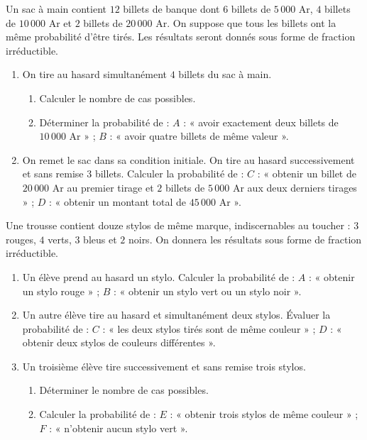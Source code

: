 \begin{annales}
Un sac à main contient $12$ billets de banque dont $6$ billets de
$5\,000$ Ar, $4$ billets de $10\,000$ Ar et $2$ billets de $20\,000$ Ar. On
suppose que tous les billets ont la même probabilité d'être tirés. Les
résultats seront donnés sous forme de fraction irréductible.
\begin{enumerate}[label=\textbf{\arabic*)}, leftmargin=*, itemsep=0.15em]
  \item On tire au hasard simultanément $4$ billets du sac à main.
        \begin{enumerate}[label=\textbf{\alph*)}, leftmargin=1.4em]
          \item Calculer le nombre de cas possibles.
          \item Déterminer la probabilité de :
                $A$ : « avoir exactement deux billets de $10\,000$ Ar » ;
                $B$ : « avoir quatre billets de même valeur ».
        \end{enumerate}
  \item On remet le sac dans sa condition initiale. On tire au hasard
        successivement et sans remise $3$ billets. Calculer la probabilité
        de :
        $C$ : « obtenir un billet de $20\,000$ Ar au premier tirage et
        $2$ billets de $5\,000$ Ar aux deux derniers tirages » ;
        $D$ : « obtenir un montant total de $45\,000$ Ar ».
\end{enumerate}

Une trousse contient douze stylos de même marque, indiscernables au
toucher : $3$ rouges, $4$ verts, $3$ bleus et $2$ noirs. On donnera les
résultats sous forme de fraction irréductible.
\begin{enumerate}[label=\textbf{\arabic*)}, leftmargin=*, itemsep=0.15em]
  \item Un élève prend au hasard un stylo. Calculer la probabilité de :
        $A$ : « obtenir un stylo rouge » ; $B$ : « obtenir un stylo vert ou
        un stylo noir ».
  \item Un autre élève tire au hasard et simultanément deux stylos.
        Évaluer la probabilité de :
        $C$ : « les deux stylos tirés sont de même couleur » ;
        $D$ : « obtenir deux stylos de couleurs différentes ».
  \item Un troisième élève tire successivement et sans remise trois stylos.
        \begin{enumerate}[label=\textbf{\alph*)}, leftmargin=1.4em]
          \item Déterminer le nombre de cas possibles.
          \item Calculer la probabilité de :
                $E$ : « obtenir trois stylos de même couleur » ;
                $F$ : « n'obtenir aucun stylo vert ».
        \end{enumerate}
\end{enumerate}


\end{annales}
